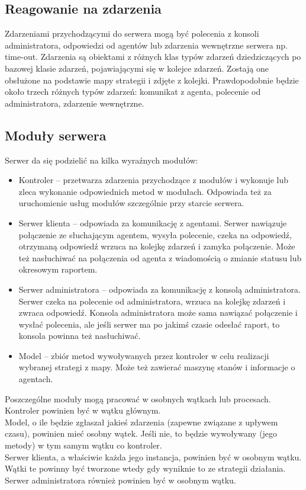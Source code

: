 \documentclass[10pt,a4paper]{article}
\begin{document}
		\subsection{Reagowanie na zdarzenia}
			Zdarzeniami przychodzącymi do serwera mogą być polecenia z konsoli administratora, odpowiedzi od agentów lub zdarzenia wewnętrzne serwera np. time-out. Zdarzenia są obiektami z różnych klas typów zdarzeń dziedziczących po bazowej klasie zdarzeń, pojawiającymi się w kolejce zdarzeń. Zostają one obsłużone na podstawie mapy strategii i zdjęte z kolejki. Prawdopodobnie będzie około trzech różnych typów zdarzeń: komunikat z agenta, polecenie od administratora, zdarzenie wewnętrzne.
		
		\subsection{Moduły serwera}
			Serwer da się podzielić na kilka wyraźnych modułów: \\
			
			\begin{itemize}   
				\item Kontroler – przetwarza zdarzenia przychodzące z modułów i wykonuje lub zleca wykonanie odpowiednich metod w modułach. Odpowiada też za uruchomienie usług modułów szczególnie przy starcie serwera.
				\item Serwer klienta – odpowiada za komunikację z agentami. Serwer nawiązuje połączenie ze słuchającym agentem, wysyła polecenie, czeka na odpowiedź, otrzymaną odpowiedź wrzuca na kolejkę zdarzeń i zamyka połączenie. Może też nasłuchiwać na połączenia od agenta z wiadomością o zmianie statusu lub okresowym raportem.
				\item Serwer administratora – odpowiada za komunikację z konsolą administratora. Serwer czeka na polecenie od administratora, wrzuca na kolejkę zdarzeń i zwraca odpowiedź. Konsola administratora może sama nawiązać połączenie i wysłać polecenia, ale jeśli serwer ma po jakimś czasie odesłać raport, to konsola powinna też nasłuchiwać.
				\item Model – zbiór metod wywoływanych przez kontroler w celu realizacji wybranej strategi z mapy. Może też zawierać maszynę stanów i informacje o agentach.
			\end{itemize}
			Poszczególne moduły mogą pracować w osobnych wątkach lub procesach. Kontroler powinien być w wątku głównym. \\
			Model, o ile będzie zgłaszał jakieś zdarzenia (zapewne związane z upływem czasu), powinien mieć osobny wątek. Jeśli nie, to będzie wywoływany (jego metody) w tym samym wątku co kontroler. \\
			Serwer klienta, a właściwie każda jego instancja, powinien być w osobnym wątku. Wątki te powinny być tworzone wtedy gdy wyniknie to ze strategii działania. \\
			Serwer administratora również powinien być w osobnym wątku. \\
		
\end{document}
